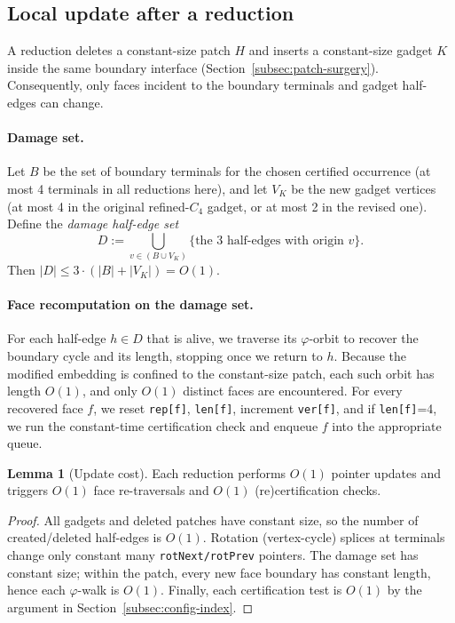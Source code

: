 \documentclass[12pt]{article}
\theoremstyle{definition}
\newtheorem{lemma}[theorem]{Lemma}
\begin{document}
\subsection{Local update after a reduction}
\label{subsec:local-update}

A reduction deletes a constant-size patch $H$ and inserts a constant-size gadget $K$ inside the same boundary interface
(Section~\ref{subsec:patch-surgery}). Consequently, only faces incident to the boundary terminals and gadget half-edges
can change.

\paragraph{Damage set.}
Let $B$ be the set of boundary terminals for the chosen certified occurrence (at most 4 terminals in all reductions here),
and let $V_K$ be the new gadget vertices (at most 4 in the original refined-$C_4$ gadget, or at most 2 in the revised one).
Define the \emph{damage half-edge set}
\[
D := \bigcup_{v\in (B\cup V_K)} \{\text{the 3 half-edges with origin }v\}.
\]
Then $|D| \le 3\cdot(|B|+|V_K|)=O(1)$.

\paragraph{Face recomputation on the damage set.}
For each half-edge $h\in D$ that is alive, we traverse its $\varphi$-orbit to recover the boundary cycle and its length,
stopping once we return to $h$.
Because the modified embedding is confined to the constant-size patch, each such orbit has length $O(1)$, and only $O(1)$
distinct faces are encountered. For every recovered face $f$, we reset \texttt{rep[f]}, \texttt{len[f]}, increment
\texttt{ver[f]}, and if \texttt{len[f]}=4, we run the constant-time certification check and enqueue $f$ into the appropriate queue.

\begin{lemma}[Update cost]
\label{lem:update-constant}
Each reduction performs $O(1)$ pointer updates and triggers $O(1)$ face re-traversals and $O(1)$ (re)certification checks.
\end{lemma}
\begin{proof}
All gadgets and deleted patches have constant size, so the number of created/deleted half-edges is $O(1)$.
Rotation (vertex-cycle) splices at terminals change only constant many \texttt{rotNext/rotPrev} pointers.
The damage set has constant size; within the patch, every new face boundary has constant length, hence each $\varphi$-walk is $O(1)$.
Finally, each certification test is $O(1)$ by the argument in Section~\ref{subsec:config-index}.
\end{proof}
\end{document}
